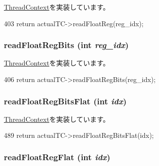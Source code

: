 \hyperlink{classThreadContext_a7883083f396dee2160e4b8640d02f5f6}{ThreadContext}を実装しています。


\begin{DoxyCode}
403     { return actualTC->readFloatReg(reg_idx); }
\end{DoxyCode}
\hypertarget{classProxyThreadContext_a4998e6615f835676762af364eff198e3}{
\subsubsection[{readFloatRegBits}]{ readFloatRegBits (int {\em reg\_\-idx})}}
\label{classProxyThreadContext_a4998e6615f835676762af364eff198e3}


\hyperlink{classThreadContext_a66bf9e1bf11ad15d1903209dd37014c5}{ThreadContext}を実装しています。


\begin{DoxyCode}
406     { return actualTC->readFloatRegBits(reg_idx); }
\end{DoxyCode}
\hypertarget{classProxyThreadContext_a2fa29585c9694c9bffcce2a63f871759}{
\subsubsection[{readFloatRegBitsFlat}]{ readFloatRegBitsFlat (int {\em idx})}}
\label{classProxyThreadContext_a2fa29585c9694c9bffcce2a63f871759}


\hyperlink{classThreadContext_a3715f0deff5e4aeb64a8cf3ca293068b}{ThreadContext}を実装しています。


\begin{DoxyCode}
489     { return actualTC->readFloatRegBitsFlat(idx); }
\end{DoxyCode}
\hypertarget{classProxyThreadContext_aaa32dc9f4a8719a465c267fed47cbdc6}{
\subsubsection[{readFloatRegFlat}]{ readFloatRegFlat (int {\em idx})}}
\label{classProxyThreadContext_aaa32dc9f4a8719a465c267fed47cbdc6}


